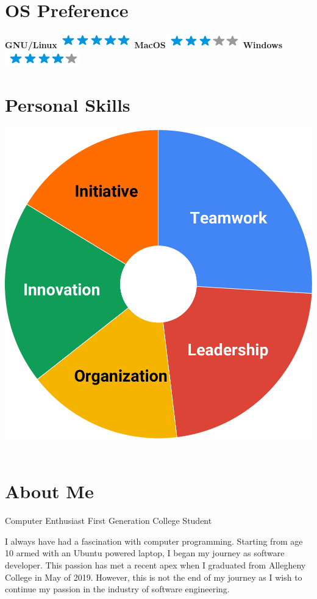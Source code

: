 \documentclass[]{friggeri-cv}
\begin{document}
\begin{aside}
  \section{OS Preference}
    \textbf{GNU/Linux}\includegraphics[scale=0.40]{img/5stars.png}
    \textbf{MacOS}\includegraphics[scale=0.40]{img/3stars.png}
    \textbf{Windows}\includegraphics[scale=0.40]{img/4stars.png}
    ~
  \section{Personal Skills}
    \includegraphics[scale=0.2]{img/skills.pdf}
    ~
\end{aside}

\section{About Me}
\begin{entrylist}
	\entry
	{}
	{Computer Enthusiast}
	{First Generation College Student}
	{
		I always have had a fascination with computer programming.  Starting from age 10 armed with an Ubuntu powered laptop, I began my journey as software developer. This passion has met a recent apex when I graduated from Allegheny College in May of 2019.  However, this is not the end of my journey as I wish to continue my passion in the industry of software engineering.

	}
\end{entrylist}
\end{document}
